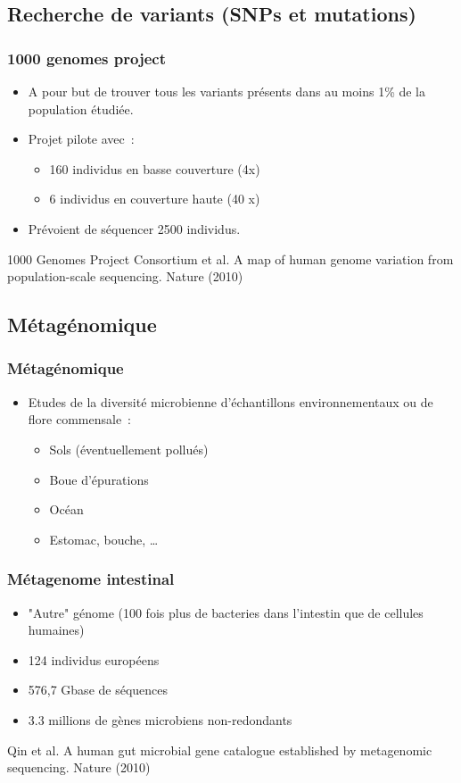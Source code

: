\documentclass{beamer}
\begin{document}

\subsection{Recherche de variants (SNPs et mutations)} %
\label{sub:decouverte_de_variants}
\begin{frame}
	\frametitle{1000 genomes project}
\begin{itemize}
\item A pour but de trouver tous les variants présents dans au moins 1\% de la population étudiée.
\item Projet pilote avec~: 
\begin{itemize}
	\item 160 individus en basse couverture (4x) 
	\item 6 individus en couverture haute (40 x)
\end{itemize}
\item Prévoient de séquencer 2500 individus.
\end{itemize}
\small{1000 Genomes Project Consortium et al. A map of human genome variation from population-scale sequencing. Nature (2010)}
\end{frame}



\subsection{Métagénomique} %
\label{sub:métagénomique}

\begin{frame}
	\frametitle{Métagénomique}
\begin{itemize}
	\item Etudes de la diversité microbienne d'échantillons environnementaux ou de flore commensale~:
	\begin{itemize}
		\item Sols (éventuellement pollués)
		\item Boue d'épurations
		\item Océan
		\item Estomac, bouche, \ldots
	\end{itemize}
\end{itemize}
\end{frame}


\begin{frame}
	\frametitle{Métagenome intestinal}
\begin{itemize}
	\item "Autre" génome (100 fois plus de bacteries dans l'intestin que de cellules humaines)
	\item 124 individus européens
	\item 576,7 Gbase de séquences
	\item  3.3 millions de gènes microbiens non-redondants
\end{itemize}
\tiny{Qin et al. A human gut microbial gene catalogue established by metagenomic sequencing. Nature (2010)}
\end{frame}
\end{document}
